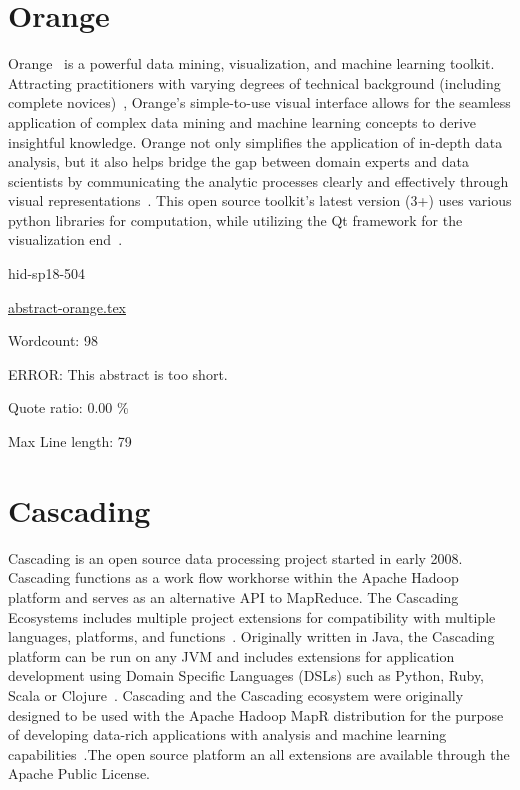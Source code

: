 \section{Orange}

Orange~\cite{hid-sp18-504-orange} is a powerful data mining, visualization, 
and machine learning toolkit. Attracting practitioners with varying degrees of
technical background (including complete novices)~\cite{hid-sp18-504-orange}, 
Orange's simple-to-use visual interface allows for the seamless application of 
complex data mining and machine learning concepts to derive insightful 
knowledge. Orange not only simplifies the application of in-depth data 
analysis, but it also helps bridge the gap between domain experts and 
data scientists by communicating the analytic processes clearly and 
effectively through visual representations~\cite{hid-sp18-504-orange}. 
This open source toolkit's latest version (3+) uses various python libraries 
for computation, while utilizing the Qt framework for the visualization 
end~\cite{hid-sp18-504-wiki-orange}.

\begin{IU}

hid-sp18-504

\href{https://github.com/cloudmesh-community/hid-sp18-504/blob/master//technology/abstract-orange.tex}{abstract-orange.tex}

 

Wordcount: 98

ERROR: This abstract is too short.


Quote ratio: 0.00 \%
 
Max Line length: 79
\end{IU}

\section{Cascading}

Cascading is an open source data processing project started in early
2008. Cascading functions as a work flow workhorse within the Apache
Hadoop platform and serves as an alternative API to MapReduce. The
Cascading Ecosystems includes multiple project extensions for
compatibility with multiple languages, platforms, and
functions~\cite{hid-sp18-507-CascadingEco}. Originally written in
Java, the Cascading platform can be run on any JVM and includes
extensions for application development using Domain Specific Languages
(DSLs) such as Python, Ruby, Scala or
Clojure~\cite{hid-sp18-507-GitHubCascading}. Cascading and the
Cascading ecosystem were originally designed to be used with the
Apache Hadoop MapR distribution for the purpose of developing
data-rich applications with analysis and machine learning
capabilities~\cite{hid-sp18-507-MapR}.The open source platform an all
extensions are available through the Apache Public License.


